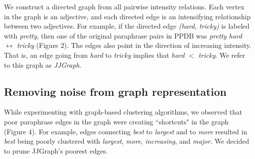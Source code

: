 \documentclass[11pt,a4paper]{article}
\begin{document}
We construct a directed graph from all pairwise intensity relations. Each vertex in the graph is an adjective, and each directed edge is an intensifying  relationship between two adjectives. For example, if the directed edge \textit{(hard, tricky)} is labeled with \textit{pretty}, then one of the original paraphrase pairs in PPDB was \textit{pretty hard} $\leftrightarrow$ \textit{tricky} (Figure 2). The edges also point in the direction of increasing intensity. That is, an edge going from \textit{hard} to \textit{tricky} implies that \textit{hard} $<$ \textit{tricky}. We refer to this graph as \textit{JJGraph}.

\subsection{Removing noise from graph representation}

While experimenting with graph-based clustering algorithms, we observed that poor paraphrase edges in the graph were creating ``shortcuts" in the graph (Figure 4). For example, edges connecting \textit{best} to \textit{largest} and to \textit{more} resulted in \textit{best} being poorly clustered with \textit{largest}, \textit{more}, \textit{increasing}, and \textit{major}. We decided to prune JJGraph's poorest edges. 


\end{document}

